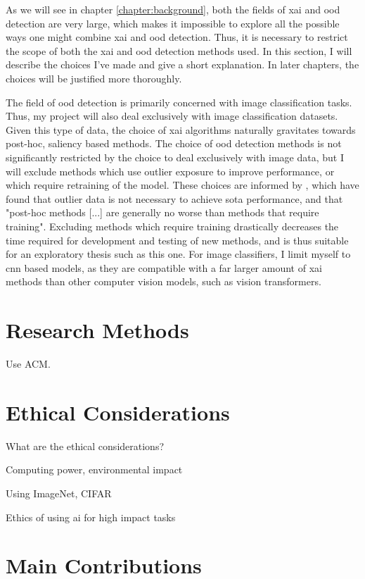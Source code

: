\documentclass[UKenglish]{uiomasterthesis} %
\theoremstyle{definition}
\begin{document}
As we will see in chapter \ref{chapter:background}, both the fields of \ac{xai} and \ac{ood} detection are very large, which makes it impossible to explore all the possible ways one might combine \ac{xai} and \ac{ood} detection. Thus, it is necessary to restrict the scope of both the \ac{xai} and \ac{ood} detection methods used. In this section, I will describe the choices I've made and give a short explanation. In later chapters, the choices will be justified more thoroughly.

The field of \ac{ood} detection is primarily concerned with image classification tasks. Thus, my project will also deal exclusively with image classification datasets. Given this type of data, the choice of \ac{xai} algorithms naturally gravitates towards post-hoc, saliency based methods. The choice of \ac{ood} detection methods is not significantly restricted by the choice to deal exclusively with image data, but I will exclude methods which use outlier exposure to improve performance, or which require retraining of the model. These choices are informed by \cite{openood}, which have found that outlier data is not necessary to achieve \ac{sota} performance, and that "post-hoc methods [...] are generally no worse than methods that require training". Excluding methods which require training drastically decreases the time required for development and testing of new methods, and is thus suitable for an exploratory thesis such as this one. For image classifiers, I limit myself to \ac{cnn} based models, as they are compatible with a far larger amount of \ac{xai} methods than other computer vision models, such as vision transformers.

\section{Research Methods}

Use ACM.

\section{Ethical Considerations}

What are the ethical considerations?

Computing power, environmental impact

Using ImageNet, CIFAR

Ethics of using ai for high impact tasks

\section{Main Contributions}
\end{document}
